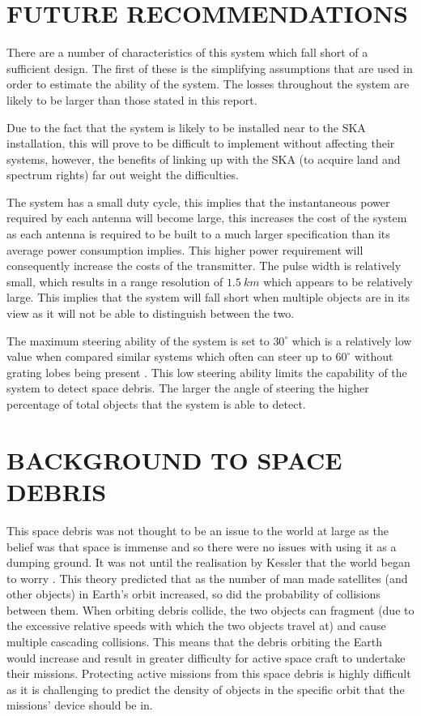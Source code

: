 \documentclass[11pt]{witseiepaper}
\begin{document}
\begin{bibunit}[witseie]
\newpage

\section{FUTURE RECOMMENDATIONS} \label{sec:FutureRecommendations}
There are a number of characteristics of this system which fall short of a sufficient design.
The first of these is the simplifying assumptions that are used in order to estimate the ability of the system. The losses throughout the system are likely to be larger than those stated in this report. 

Due to the fact that the system is likely to be installed near to the SKA installation, this will prove to be difficult to implement without affecting their systems, however, the benefits of linking up with the SKA (to acquire land and spectrum rights) far out weight the difficulties.

The system has a small duty cycle, this implies that the instantaneous power required by each antenna will become large, this increases the cost of the system as each antenna is required to be built to a much larger specification than its average power consumption implies. This higher power requirement will consequently increase the costs of the transmitter.
The pulse width is relatively small, which results in a range resolution of $1.5~km$ which appears to be relatively large. This implies that the system will fall short when multiple objects are in its view as it will not be able to distinguish between the two.

The maximum steering ability of the system is set to $30^{\circ}$ which is a relatively low value when compared similar systems which often can steer up to $60^{\circ}$ without grating lobes being present \cite{maxAngle}. This low steering ability limits the capability of the system to detect space debris. The larger the angle of steering the higher percentage of total objects that the system is able to detect.

\section{BACKGROUND TO SPACE DEBRIS} \label{sec:BackgroundToSpaceDebris}

This space debris was not thought to be an issue to the world at large as the belief was that space is immense and so there were no issues with using it as a dumping ground. It was not until the realisation by Kessler that the world began to worry \cite{Kessler}. This theory predicted that as the number of man made satellites (and other objects) in Earth's orbit increased, so did the probability of collisions between them. When orbiting debris collide, the two objects can fragment (due to the excessive relative speeds with which the two objects travel at) and cause multiple cascading collisions. This means that the debris orbiting the Earth would increase and result in greater difficulty for active space craft to undertake their missions.
Protecting active missions from this space debris is highly difficult as it is challenging to predict the density of objects in the specific orbit that the missions' device should be in.


\end{bibunit}
\end{document}
